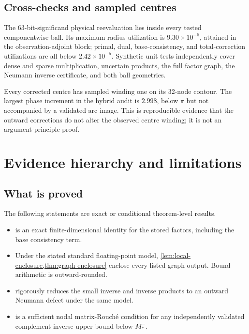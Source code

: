 \documentclass[11pt]{article}
\theoremstyle{definition}
\theoremstyle{remark}
\begin{document}
\subsection{Cross-checks and sampled centres}

The 63-bit-significand physical reevaluation lies inside every tested
componentwise ball.  Its maximum radius utilization is
\(9.30\times10^{-5}\), attained in the observation-adjoint block; primal,
dual, base-consistency, and total-correction utilizations are all below
\(2.42\times10^{-5}\).  Synthetic unit tests independently cover dense and
sparse multiplication, uncertain products, the full factor graph, the
Neumann inverse certificate, and both ball geometries.

Every corrected centre has sampled winding one on its 32-node contour.  The
largest phase increment in the hybrid audit is \(2.998\), below \(\pi\) but
not accompanied by a validated arc image.  This is reproducible evidence
that the outward corrections do not alter the observed centre winding; it
is not an argument-principle proof.

\section{Evidence hierarchy and limitations}
\label{sec:limitations}

\subsection{What is proved}

The following statements are exact or conditional theorem-level results.

\begin{itemize}
 \item {} is an exact finite-dimensional identity
 for the stored factors, including the base consistency term.
 \item Under the stated standard floating-point model,
 \cref{lem:local-enclosure,thm:graph-enclosure} enclose every listed graph
 output.  Bound arithmetic is outward-rounded.
 \item {} rigorously reduces the small inverse and inverse
 products to an outward Neumann defect under the same model.
 \item {} is a sufficient nodal matrix-Rouch\'e
 condition for any independently validated complement-inverse upper bound
 below \(M_*^-\).
\end{itemize}
\end{document}
